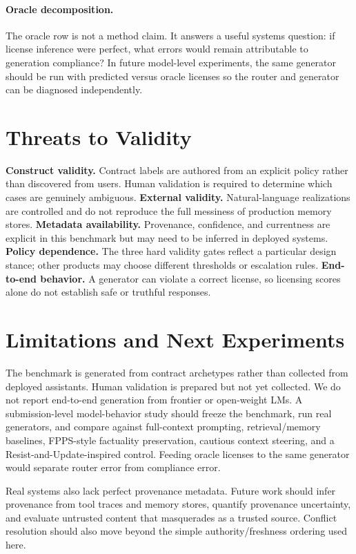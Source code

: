 \documentclass[10pt,twocolumn]{article}
\begin{document}
\paragraph{Oracle decomposition.} The oracle row is not a method claim. It answers a useful systems question: if license inference were perfect, what errors would remain attributable to generation compliance? In future model-level experiments, the same generator should be run with predicted versus oracle licenses so the router and generator can be diagnosed independently.

\section{Threats to Validity}
\textbf{Construct validity.} Contract labels are authored from an explicit policy rather than discovered from users. Human validation is required to determine which cases are genuinely ambiguous. \textbf{External validity.} Natural-language realizations are controlled and do not reproduce the full messiness of production memory stores. \textbf{Metadata availability.} Provenance, confidence, and currentness are explicit in this benchmark but may need to be inferred in deployed systems. \textbf{Policy dependence.} The three hard validity gates reflect a particular design stance; other products may choose different thresholds or escalation rules. \textbf{End-to-end behavior.} A generator can violate a correct license, so licensing scores alone do not establish safe or truthful responses.

\section{Limitations and Next Experiments}
The benchmark is generated from contract archetypes rather than collected from deployed assistants. Human validation is prepared but not yet collected. We do not report end-to-end generation from frontier or open-weight LMs. A submission-level model-behavior study should freeze the benchmark, run real generators, and compare against full-context prompting, retrieval/memory baselines, FPPS-style factuality preservation, cautious context steering, and a Resist-and-Update-inspired control. Feeding oracle licenses to the same generator would separate router error from compliance error.

Real systems also lack perfect provenance metadata. Future work should infer provenance from tool traces and memory stores, quantify provenance uncertainty, and evaluate untrusted content that masquerades as a trusted source. Conflict resolution should also move beyond the simple authority/freshness ordering used here.
\end{document}
